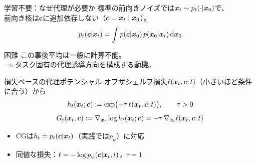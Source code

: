 \asmain
\begin{frame}{学習不要：なぜ代理が必要か}
    標準の前向きノイズでは$\bm{x}_t\sim p_t(\cdot|\bm{x}_0)$で、\\
    前向き核は$\bm{c}$に追加依存しない（$\bm{c}\perp\bm{x}_t\mid\bm{x}_0$）。
    \[
        p_t(\bm{c}|\bm{x}_t)
        =
        \int p(\bm{c}|\bm{x}_0)\,p(\bm{x}_0|\bm{x}_t)\,\mathrm{d}\bm{x}_0
    \]
    \begin{alertblock}{困難}
        この事後平均は一般に計算不能。\\
        $\Rightarrow$タスク固有の代理誘導方向を構成する動機。
    \end{alertblock}
\end{frame}
\asmain
\begin{frame}{損失ベースの代理ポテンシャル}
    オフザシェルフ損失$\ell(\bm{x}_t,\bm{c};t)$（小さいほど条件に合う）から
    \[
        h_t(\bm{x}_t;\bm{c})
        :=
        \exp\bigl(-\tau\,\ell(\bm{x}_t,\bm{c};t)\bigr),
        \qquad \tau>0
    \]
    \[
        G_t(\bm{x}_t,\bm{c})
        :=
        \nabla_{\bm{x}_t}\log h_t(\bm{x}_t;\bm{c})
        =
        -\tau\,\nabla_{\bm{x}_t}\ell(\bm{x}_t,\bm{c};t)
    \]
    \begin{itemize}
        \item CGは$h_t=p_t(\bm{c}|\bm{x}_t)$（実践では$p_\psi$）に対応
        \item 同値な損失：$\ell=-\log p_\psi(\bm{c}|\bm{x}_t,t)$，$\tau=1$
    \end{itemize}
\end{frame}
